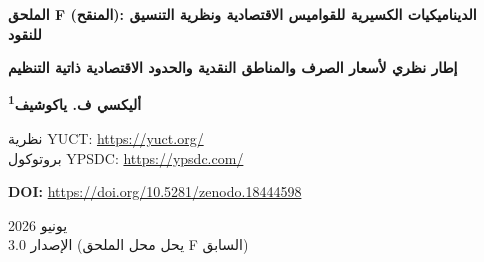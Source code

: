 \documentclass[12pt,a4paper]{article}
\theoremstyle{remark}
\begin{document}
	
	\begin{titlepage}
		\centering
		\vspace*{1cm}
		
		\Huge\textbf{الملحق F (المنقح): الديناميكيات الكسيرية للقواميس الاقتصادية ونظرية التنسيق للنقود}
		
		\vspace{0.5cm}
		\Large\textbf{إطار نظري لأسعار الصرف والمناطق النقدية والحدود الاقتصادية ذاتية التنظيم}
		
		\vspace{1.5cm}
		
		\Large\textbf{أليكسي ف. ياكوشيف\textsuperscript{1}}
		
		نظرية YUCT: \url{https://yuct.org/}\\
		بروتوكول YPSDC: \url{https://ypsdc.com/}
		
		\vspace{2cm}
		\textbf{DOI:} \url{https://doi.org/10.5281/zenodo.18444598}
		
		\vspace{1cm}
		
		\large
		يونيو 2026 \\ \large الإصدار 3.0 (يحل محل الملحق F السابق)
		
		\vspace{2cm}
		
		\begin{minipage}{0.9\textwidth}
			\begin{abstract}
				\noindent
				يقدم هذا الملحق مراجعة جذرية لمنهج YUCT في الاقتصاد. نتخلى عن جميع المحاولات السابقة لتركيب الناتج المحلي الإجمالي أو تقلبات السوق بشكل تجريبي مع الأس العالمي \(\beta = 0.67\)، وبدلاً من ذلك نطور إطاراً نظرياً من المبادئ الأولى يقوم على أنطولوجيا التنسيق. يُنمذج الاقتصاد كشبكة من \textbf{قواميس اقتصادية} متفاعلة (شركات، قطاعات، دول)، يتميز كل منها بكفاءة تنسيق \(K_{\mathrm{eff}}\). نبين أن الحدود بين أي قاموسين تبدي ديناميكيات كسيرية مشابهة لمجموعة ماندلبروت: متشابهة ذاتياً، معقدة، ومحكومة بقانون الخطأ العام \(\varepsilon = \kappa_c \alpha K_{\mathrm{eff}}^{-\beta}\). يُعرَّف المال بأنه \textbf{معامل التنسيق} الذي ينظم التنشيط عبر الحدود القاموسية؛ وبالتالي تتحدد أسعار الصرف بنسبة كفاءات التنسيق. ينتج الإطار عدة تنبؤات كمية قابلة للتفنيد: (1) يجب أن يتجمع أس هيرست لسلاسل أسعار الصرف عالية التردد حول \(H \approx 1/\beta \approx 1.5\) في المقاييس الزمنية الطويلة؛ (2) يجب أن يظهر الطيف متعدد الكسير للعوائد المالية تبايناً يسارياً ذا شكل عالمي تحدده الحلقة الجبرية الأولية؛ (3) يتناسب التقلب \(\sigma\) لسعر الصرف مع فجوة التنسيق \(\Delta K_{\mathrm{eff}}\) بين القاموسين كـ \(\sigma \propto (\Delta K_{\mathrm{eff}})^{-0.67}\). لا يتم إجراء أي تركيب تجريبي في هذا الملحق؛ تُصاغ جميع التنبؤات بشكل يمكن اختباره بمجرد توفر وكلاء موثوقين لـ \(K_{\mathrm{eff}}\) في الأنظمة الاقتصادية. يحوّل هذا العمل اقتصاد YUCT من مجموعة ارتباطات مشكوك فيها إلى برنامج بحثي صارم وقابل للتفنيد.
			\end{abstract}
		\end{minipage}
		

\end{titlepage}
\end{document}

